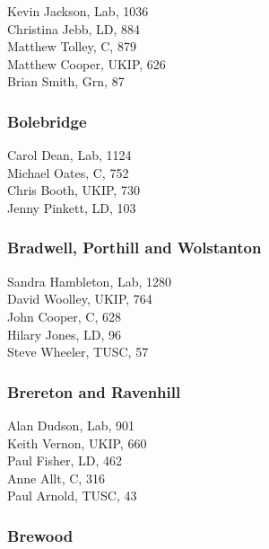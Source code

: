 \documentclass[a4paper,openany,10pt]{book}
\begin{document}
Kevin Jackson, Lab, 1036\\
Christina Jebb, LD, 884\\
Matthew Tolley, C, 879\\
Matthew Cooper, UKIP, 626\\
Brian Smith, Grn, 87\\


\subsubsection*{Bolebridge}



Carol Dean, Lab, 1124\\
Michael Oates, C, 752\\
Chris Booth, UKIP, 730\\
Jenny Pinkett, LD, 103\\


\subsubsection*{Bradwell, Porthill and Wolstanton}



Sandra Hambleton, Lab, 1280\\
David Woolley, UKIP, 764\\
John Cooper, C, 628\\
Hilary Jones, LD, 96\\
Steve Wheeler, TUSC, 57\\


\subsubsection*{Brereton and Ravenhill}



Alan Dudson, Lab, 901\\
Keith Vernon, UKIP, 660\\
Paul Fisher, LD, 462\\
Anne Allt, C, 316\\
Paul Arnold, TUSC, 43\\


\subsubsection*{Brewood}
\end{document}
